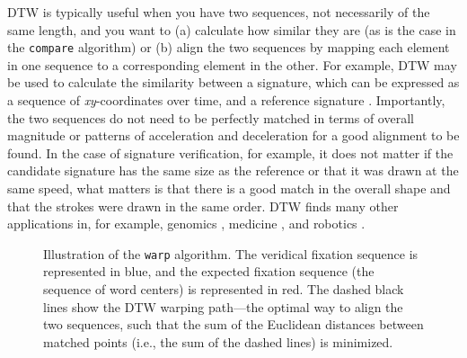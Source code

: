 \documentclass[doc,biblatex]{apa7}
\begin{document}
DTW is typically useful when you have two sequences, not necessarily of the same length, and you want to (a) calculate how similar they are (as is the case in the \texttt{compare} algorithm) or (b) align the two sequences by mapping each element in one sequence to a corresponding element in the other. For example, DTW may be used to calculate the similarity between a signature, which can be expressed as a sequence of \textit{xy}-coordinates over time, and a reference signature \parencite[e.g.,][]{Lei:2005,Riesen:2018}. Importantly, the two sequences do not need to be perfectly matched in terms of overall magnitude or patterns of acceleration and deceleration for a good alignment to be found. In the case of signature verification, for example, it does not matter if the candidate signature has the same size as the reference or that it was drawn at the same speed, what matters is that there is a good match in the overall shape and that the strokes were drawn in the same order. DTW finds many other applications in, for example, genomics \parencite{Aach:2001}, medicine \parencite{Caiani:1998}, and robotics \parencite{Vakanski:2014}.

	\begin{figure}
	\vspace*{2pt}
	\caption{Illustration of the \texttt{warp} algorithm. The veridical fixation sequence is represented in blue, and the expected fixation sequence (the sequence of word centers) is represented in red. The dashed black lines show the DTW warping path---the optimal way to align the two sequences, such that the sum of the Euclidean distances between matched points (i.e., the sum of the dashed lines) is minimized.}
	\label{fig02}
	\end{figure}
\end{document}
